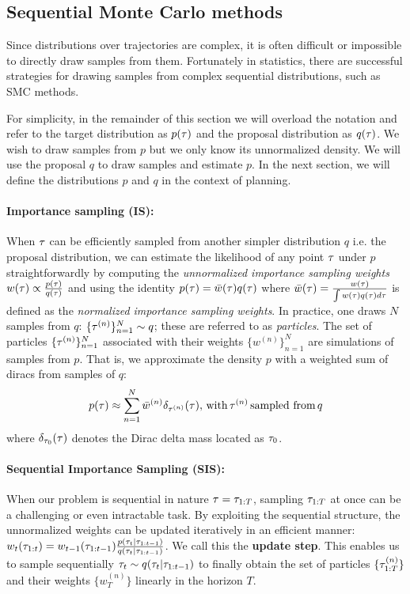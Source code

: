 \subsection{Sequential Monte Carlo methods}
\label{sec:smc}




Since distributions over trajectories are complex, it is often difficult or impossible to directly draw samples from them. Fortunately in statistics, there are successful  strategies for drawing samples from complex sequential distributions, such as SMC methods.%

For simplicity, in the remainder of this section we will overload the notation and refer to the target distribution as $p(\tau)$ and the proposal distribution as $q(\tau)$.
We wish to draw samples from $p$ but we only know its unnormalized density. We will use the proposal $q$ to draw samples and estimate $p$.
In the next section, we will define the distributions $p$ and $q$ in the context of planning.  

\paragraph{Importance sampling (IS):} When $\tau$ can be efficiently sampled from another simpler distribution $q$ i.e. the proposal distribution, we can estimate the likelihood of any point $\tau$ under $p$ straightforwardly by computing the \emph{unnormalized importance sampling weights} $w(\tau) \propto \tfrac{p(\tau)}{q(\tau)}$ and using the identity $p(\tau) = \bar{w}(\tau) q(\tau)$ where $\bar{w}(\tau) = \tfrac{w(\tau)}{\int w(\tau) q(\tau) d \tau}$ is defined as the \emph{normalized importance sampling weights}. In practice, one draws $N$ samples from $q$: $\{\tau^{(n)}\}_{n=1}^N \sim q$; these are referred to as \emph{particles}. The set of particles $\{\tau^{(n)}\}_{n=1}^N$ associated with their weights $\{{w}^{(n)} \}_{n=1}^N$ are simulations of samples from $p$. That is, we approximate the density $p$ with a weighted sum of diracs from samples of $q$: $$p(\tau) \approx \sum_{n=1}^N \bar{w}^{(n)} \delta_{\tau^{(n)}} (\tau), \, \text{with}\, \tau^{(n)}\, \text{sampled from}\, q$$ where $\delta_{\tau_0}(\tau)$ denotes the Dirac delta mass located as $\tau_0$.

\paragraph{Sequential Importance Sampling (SIS):} When our problem is sequential in nature $\tau = \tau_{1:T}$, 
sampling $\tau_{1:T}$ at once can be a challenging or even intractable task.
By exploiting the sequential structure, the unnormalized weights can be updated iteratively in an efficient manner: 
$
w_t(\traj_{1:t}) %
= w_{t-1}(\traj_{1:t-1}) \frac{p(\traj_t|\traj_{1:t-1})}{ q(\traj_t|\traj_{1:t-1})}$. We call this the \textbf{update step}. 
This enables us to sample sequentially $\tau_t \sim q(\tau_t | \tau_{1:t-1})$ to finally obtain the set of particles $\{\tau^{(n)}_{1:T}\}$ and their weights $\{{w}^{(n)}_T \}$ linearly in the horizon $T$.

